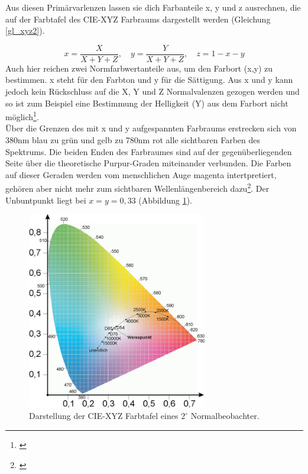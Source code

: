 \noindent Aus diesen Primärvarlenzen lassen sie dich Farbanteile x, y und z ausrechnen, die auf der Farbtafel des CIE-XYZ Farbraums dargestellt werden (Gleichung \ref{gl_xyz2}). 

\begin{equation}\label{gl_xyz2}
		x = \frac{X}{X+Y+Z},\quad y = \frac{Y}{X+Y+Z},\quad z = 1-x-y
\end{equation}
Auch hier reichen zwei Normfarbwertanteile aus, um den Farbort (x,y) zu bestimmen. x steht für den Farbton und y für die Sättigung. Aus x und y kann jedoch kein Rückschluss auf die X, Y und Z Normalvalenzen gezogen werden und so ist zum Beispiel eine Bestimmung der Helligkeit (Y) aus dem Farbort nicht möglich\footnote{\cite[79]{greule}}.\\
Über die Grenzen des mit x und y aufgespannten Farbraums erstrecken sich von 380nm blau zu grün und gelb zu 780nm rot alle sichtbaren Farben des Spektrums. Die beiden Enden des Farbraumes sind auf der gegenüberliegenden Seite über die theoretische Purpur-Graden miteinander verbunden. Die Farben auf dieser Geraden werden vom menschlichen Auge magenta intertpretiert, gehören aber nicht mehr zum sichtbaren Wellenlängenbereich dazu\footnote{\cite[73]{mueller}}. Der Unbuntpunkt liegt bei $x=y=0,33$ (Abbildung \ref{b_xyz1}).

\begin{figure}[H]     %
\centering
\includegraphics[width=0.7\textwidth]{bilder/xyz1} 
\caption {Darstellung der CIE-XYZ Farbtafel eines $2^\circ$ Normalbeobachter.\protect\footnotemark}\label{b_xyz1}
\end{figure}

